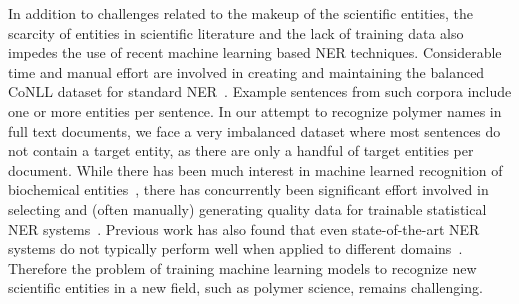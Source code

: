 
In addition to challenges related to the makeup of the scientific entities, the scarcity of entities in scientific literature and the lack of training data also impedes the use of recent machine learning based NER techniques.
Considerable time and manual effort are involved in creating and maintaining the balanced
CoNLL dataset for standard NER~\cite{tjong2003introduction}.
Example sentences from such corpora include one or more entities per sentence. 
In our attempt to recognize polymer names in full text documents, we face a very imbalanced dataset where most sentences do not contain a target entity, as there are only a handful of target entities per document.
While there has been much interest in machine learned recognition of biochemical entities~\cite{jessop2011oscar4,rocktaschel2012chemspot,leaman2015tmchem,swain2016chemdataextractor}, 
there has concurrently been significant effort involved in selecting and (often manually) generating quality data for
trainable statistical NER systems~\cite{krallinger2015chemdner}. 
Previous work has also found that even state-of-the-art NER systems do
not typically perform well when applied to different domains~\cite{krallinger2013overview}. 
Therefore the problem of training machine learning models to recognize new scientific entities in a new field, such as polymer science, remains challenging.

